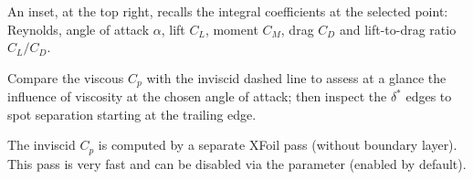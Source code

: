 An inset, at the top right, recalls the integral coefficients at the
selected point: Reynolds, angle of attack $\alpha$, lift $C_L$, moment
$C_M$, drag $C_D$ and lift-to-drag ratio $C_L/C_D$.

\begin{astuce}
Compare the viscous $C_p$ with the inviscid dashed line to assess at a
glance the influence of viscosity at the chosen angle of attack; then
inspect the $\delta^*$ edges to spot separation starting at the
trailing edge.
\end{astuce}

\begin{noteinfo}
The inviscid $C_p$ is computed by a separate XFoil pass (without
boundary layer). This pass is very fast and can be disabled via the
 parameter (enabled by default).
\end{noteinfo}
